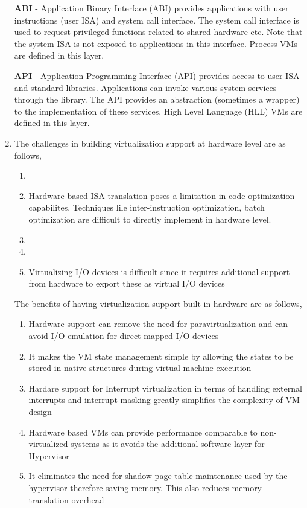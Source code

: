 \documentclass[11pt,a4paper,oneside]{article}
\begin{document}
\begin{enumerate}
		\textbf{ABI} - Application Binary Interface (ABI) provides applications with user instructions (user ISA) and system call interface. The system call interface is used to request privileged functions related to shared hardware etc. Note that the system ISA is not exposed to applications in this interface. Process VMs are defined in this layer.
		
		\textbf{API} - Application Programming Interface (API) provides access to user ISA and standard libraries. Applications can invoke various system services through the library. The API provides an abstraction (sometimes a wrapper) to the implementation of these services. High Level Language (HLL) VMs are defined in this layer. 
		
		\item The challenges in building virtualization support at hardware level are as follows,
			\begin{enumerate}
				\item 
				\item Hardware based ISA translation poses a limitation in code optimization capabilites. Techniques lile inter-instruction optimization, batch optimization are difficult to directly implement in hardware level.
				\item 
				\item 
				\item Virtualizing I/O devices is difficult since it requires additional support from hardware to export these as virtual I/O devices 
			\end{enumerate}
		     The benefits of having virtualization support built in hardware are as follows,
		     \begin{enumerate}
		     	\item Hardware support can remove the need for paravirtualization and can avoid I/O emulation for direct-mapped I/O devices
		     	\item It makes the VM state management simple by allowing the states to be stored in native structures during virtual machine execution
		     	\item Hardare support for Interrupt virtualization in terms of handling external interrupts and interrupt masking greatly simplifies the complexity of VM design
		     	\item Hardware based VMs can provide performance comparable to non-virtualized systems as it avoids the additional software layer for Hypervisor
		     	\item It eliminates the need for shadow page table maintenance used by the hypervisor therefore saving memory. This also reduces memory translation overhead
		     \end{enumerate}		
		

\end{enumerate}
\end{document}
